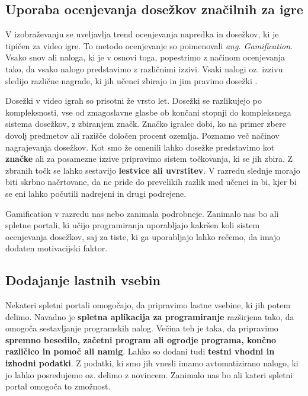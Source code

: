 \subsection{Uporaba ocenjevanja dosežkov značilnih za igre}
\label{sec:uporaba_dosežkov}

V izobraževanju se uveljavlja trend ocenjevanja napredka in dosežkov,
ki je tipičen za video igre. To metodo ocenjevanje so poimenovali
\emph{ang. Gamification}. Vsako snov ali naloga, ki je v osnovi toga,
popestrimo z načinom ocenjevanja tako, da vsako nalogo predstavimo z
različnimi izzivi. Vsaki nalogi oz. izzivu sledijo različne nagrade,
ki jih učenci zbirajo in jim pravimo dosežki \cite{web:edublogger}.

Dosežki v video igrah so prisotni že vrsto let. Dosežki se razlikujejo
po kompleksnosti, vse od zmagoslavne glasbe ob končani stopnji do
kompleksnega sistema dosežkov, z zbiranjem značk. Značko igralec dobi,
ko na primer zbere dovolj predmetov ali razišče določen procent
ozemlja. Poznamo več načinov nagrajevanja dosežkov. Kot smo že omenili
lahko dosežke predstavimo kot \textbf{značke} ali za posamezne izzive
pripravimo sistem točkovanja, ki se jih zbira. Z zbranih točk se lahko
sestavijo \textbf{lestvice ali uvrstitev}. V razredu slednje morajo
biti skrbno načrtovane, da ne pride do prevelikih razlik med učenci in
bi, kjer bi se eni lahko počutili nadrejeni in drugi podrejene.

Gamification v razredu nas nebo zanimala podrobneje. Zanimalo nas bo
ali spletne portali, ki učijo programiranja uporabljajo kakršen koli
sistem ocenjevanja dosežkov, saj za tiste, ki ga uporabljajo lahko
rečemo, da imajo dodaten motivacijski faktor.

\subsection{Dodajanje lastnih vsebin}
\label{sec:dodajanje_vsebin}

Nekateri spletni portali omogočajo, da pripravimo lastne vsebine, ki
jih potem delimo. Navadno je \textbf{spletna aplikacija za
  programiranje} razširjena tako, da omogoča sestavljanje programskih
nalog. Večina teh je taka, da pripravimo \textbf{spremno besedilo,
  začetni program ali ogrodje programa, končno različico in pomoč ali
  namig}. Lahko so dodani tudi \textbf{testni vhodni in izhodni
  podatki}. Z podatki, ki smo jih vnesli imamo avtomatizirano nalogo,
ki jo lahko posredujemo oz. delimo z novincem. Zanimalo nas bo ali
kateri spletni portal omogoča to zmožnost.


